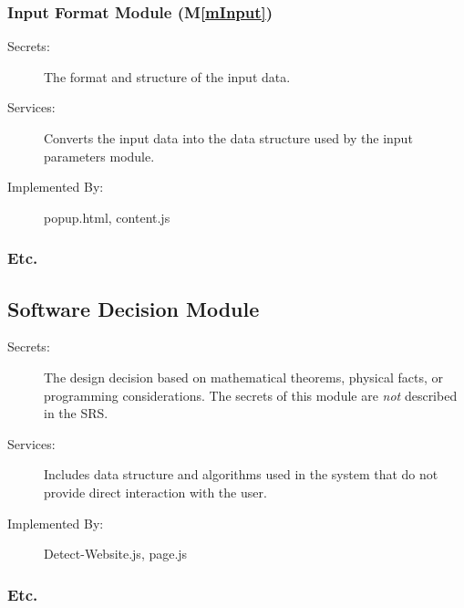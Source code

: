 \documentclass[12pt, titlepage]{article}
\newcommand{\mref}[1]{M\ref{#1}}
\begin{document}
\subsubsection{Input Format Module (\mref{mInput})} %
\begin{description}
\item[Secrets:]The format and structure of the input data.
\item[Services:]Converts the input data into the data structure used by the
  input parameters module.
\item[Implemented By:] popup.html, content.js
\end{description}
\subsubsection{Etc.}
\subsection{Software Decision Module}
\begin{description}
\item[Secrets:] The design decision based on mathematical theorems, physical
  facts, or programming considerations. The secrets of this module are
  \emph{not} described in the SRS.
\item[Services:] Includes data structure and algorithms used in the system that
  do not provide direct interaction with the user. 
\item[Implemented By:] Detect-Website.js, page.js
\end{description}
\subsubsection{Etc.} %
\end{document}

